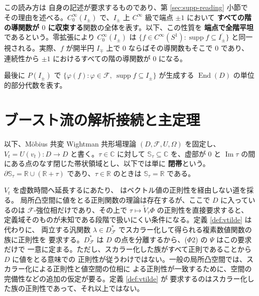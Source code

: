 \documentclass[11pt,a4paper]{article}
\newcommand{\Circ}{S^{1}}
\newcommand{\Fields}{\mathcal{F}}
\newcommand{\Strip}{\mathbb{S}}
\newcommand{\Vt}{\widetilde{V}}
\newcommand{\Dom}{D}
\newcommand{\Dstar}{\Dom^{*}_{\Fields}}
\theoremstyle{definition}
\begin{document}
この読み方は \cite{T26} 自身の記述が要求するものであり、第 \ref{sec:supp-reading} 小節で
その理由を述べる。$C_0^\infty(I_\pm)$ で、$I_\pm$ 上 $C^\infty$ 級で端点 $\pm 1$ において
\textbf{すべての階の導関数が $0$ に収束する}関数の全体を表す。以下、この性質を
\textbf{端点で全階平坦}であるという。零拡張により
$C_0^\infty(I_\pm)$ は $\{f \in C^\infty(\Circ) : \operatorname{supp} f \subseteq \overline{I_\pm}\}$
と同一視される。実際、$f$ が開半円 $I_\mp$ 上で $0$ ならばその導関数もそこで $0$ であり、
連続性から $\pm 1$ におけるすべての階の導関数が $0$ になる。

最後に $P(I_\pm)$ で $\{\varphi(f) : \varphi \in \Fields,\ \operatorname{supp} f \subseteq I_\pm\}$
が生成する $\operatorname{End}(\Dom)$ の単位的部分代数を表す。

\section{ブースト流の解析接続と主定理}

以下、M\"obius 共変 Wightman 共形場理論 $(\Dom, \Fields, U, \Omega)$ を固定し、
$V_t = U(v_t) : \Dom \to \Dom$ と書く。$\tau \in \mathbb{C}$ に対して $\Strip_\tau \subseteq \mathbb{C}$
を、虚部が $0$ と $\operatorname{Im}\tau$ の間にある点のなす閉じた帯状領域とし、以下では単に
\textbf{閉帯}という。
$\partial\Strip_\tau = \mathbb{R} \cup (\mathbb{R} + \tau)$ であり、$\tau \in \mathbb{R}$ のときは
$\Strip_\tau = \mathbb{R}$ である。

$V_t$ を虚数時間へ延長するにあたり、\cite{T26} はベクトル値の正則性を経由しない道を採る。
局所凸空間に値をとる正則関数の理論は存在するが、ここで $\Dom$ に入っているのは
$\Fields$-強位相だけであり、その上で $\tau \mapsto \Vt_\tau\Phi$ の正則性を直接要求すると、
定義域そのものが未知である段階で扱いにくい条件になる。定義 \ref{def:vtilde} は代わりに、
両立する汎関数 $\lambda \in \Dstar$ でスカラー化して得られる複素数値関数の族に正則性を
要求する。$\Dstar$ は $\Dom$ の点を分離するから、($\Phi$2) の $\Psi$ はこの要求だけで
一意に定まる。ただし、スカラー化した族がすべて正則であることから $\Dom$ に値をとる意味での
正則性が従うわけではない。一般の局所凸空間では、スカラー化による正則性と値空間の位相に
よる正則性が一致するために、空間の完備性などの追加の仮定が要る。定義 \ref{def:vtilde} が
要求するのはスカラー化した族の正則性であって、それ以上ではない。
\end{document}
